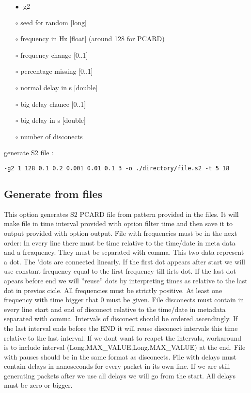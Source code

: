 \documentclass[english]{article}
\begin{document}
\begin{itemize}
\item[$\bullet$] -g2
\item[$\circ$] seed for random [long]
\item[$\circ$] frequency in Hz [float] (around 128 for PCARD)
\item[$\circ$] frequency change [0..1]
\item[$\circ$] percentage missing [0..1]
\item[$\circ$] normal delay in s [double]
\item[$\circ$] big delay chance [0..1]
\item[$\circ$] big delay in s [double]
\item[$\circ$] number of disconects

\end{itemize}
generate S2 file : 
\begin{lstlisting} 
-g2 1 128 0.1 0.2 0.001 0.01 0.1 3 -o ./directory/file.s2 -t 5 18
\end{lstlisting}

\subsection{Generate from files}
This option generates S2 PCARD file from pattern provided in the files. It will make file in time interval provided with option filter time and then save it to output provided with option output. File with frequencies must be in the next order: In every line there must be time relative to the time/date in meta data and a freaquency. They must be separated with comma. This two data represent a dot. The 'dots are connected linearly. If the first dot appears after start we will use constant frequency equal to the first frequency till firts dot. If the last dot apears before end we will ''reuse'' dots by interpreting times as relative to the last dot in previos cicle. All frequencies must be strictly positive. At least one frequency with time bigger that 0 must be given. File disconects must contain in every line start and end of disconect relative to the time/date in metadata separated with comma. Intervals of disconect should be ordered ascendingly. If the last interval ends before the END it will reuse disconect intervals this time relative to the last interval. If we dont want to reapet the intervals, workaround is to include interval (Long.MAX\_VALUE,Long.MAX\_VALUE) at the end. File with pauses should be in the same format as disconects. File with delays must contain delays in nanoseconds for every packet in its own line. If we are still generating packets after we use all delays we will go from the start. All delays must be zero or bigger.
\end{document}
